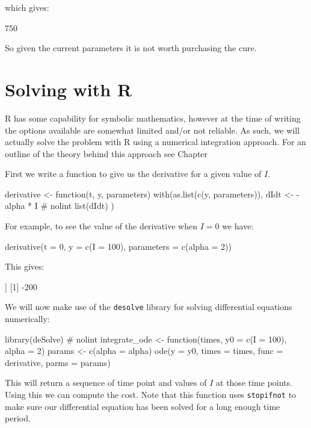 which gives:

\begin{pyout}
750
\end{pyout}

So given the current parameters it is not worth purchasing the cure.

\section{Solving with R}\label{sec:solving-with-R}

R has some capability for symbolic mathematics, however at the time of writing
the options available are somewhat limited and/or not reliable. As such, we will
actually solve the problem with R using a numerical integration approach. For an
outline of the theory behind this approach see Chapter %

First we write a function to give us the derivative for a given value of \(I\).

\begin{Rin}
derivative <- function(t, y, parameters) {
  with(as.list(c(y, parameters)), {
    dIdt <- -alpha * I  # nolint
    list(dIdt)
  })
}
\end{Rin}

For example, to see the value of the derivative when \(I=0\) we have:

\begin{Rin}
derivative(t = 0, y = c(I = 100), parameters = c(alpha = 2))
\end{Rin}

This gives:

\begin{Rout}
[[1]]
[1] -200

\end{Rout}

We will now make use of the \texttt{desolve} library for solving
differential equations numerically:

\begin{Rin}
library(deSolve)  # nolint
integrate_ode <- function(times,
                          y0 = c(I = 100),
                          alpha = 2) {
  params <- c(alpha = alpha)
  ode(y = y0, times = times, func = derivative, parms = params)
}
\end{Rin}

This will return a sequence of time point and values of \(I\) at those time
points. Using this we can compute the cost. Note that this function uses
\texttt{stopifnot} to make sure our differential equation has been solved
for a long enough time period.

